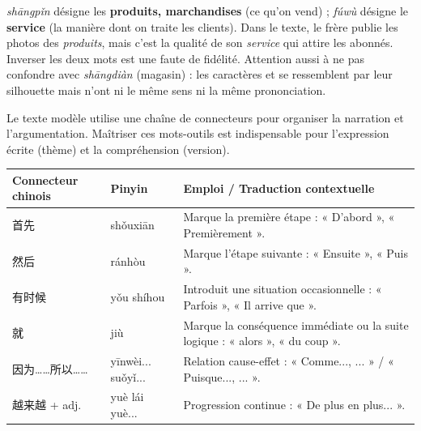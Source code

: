 \documentclass[11pt]{article}
\newcommand{\zh}[1]{\ifmmode\text{#1}\else{#1}\fi}
\begin{document}
\begin{attention}
\zh{商品} \emph{shāngpǐn} désigne les \textbf{produits, marchandises} (ce qu'on vend) ; \zh{服务} \emph{fúwù} désigne le \textbf{service} (la manière dont on traite les clients). Dans le texte, le frère publie les photos des \emph{produits}, mais c'est la qualité de son \emph{service} qui attire les abonnés. Inverser les deux mots est une faute de fidélité. Attention aussi à ne pas confondre \zh{商品} avec \zh{商店} \emph{shāngdiàn} (magasin) : les caractères \zh{品} et \zh{店} se ressemblent par leur silhouette mais n'ont ni le même sens ni la même prononciation.
\end{attention}

\begin{propriete}
Le texte modèle utilise une chaîne de connecteurs pour organiser la narration et l'argumentation. Maîtriser ces mots-outils est indispensable pour l'expression écrite (thème) et la compréhension (version).

\begin{center}
\begin{tabularx}{\linewidth}{|X|X|X|}
\hline
\rowcolor{popblueL} Connecteur chinois & Pinyin & Emploi / Traduction contextuelle \\
\hline
首先 & shǒuxiān & Marque la première étape : « D'abord », « Premièrement ». \\
\hline
然后 & ránhòu & Marque l'étape suivante : « Ensuite », « Puis ». \\
\hline
有时候 & yǒu shíhou & Introduit une situation occasionnelle : « Parfois », « Il arrive que ». \\
\hline
就 & jiù & Marque la conséquence immédiate ou la suite logique : « alors », « du coup ». \\
\hline
因为……所以…… & yīnwèi... suǒyǐ... & Relation cause-effet : « Comme..., ... » / « Puisque..., ... ». \\
\hline
越来越 + adj. & yuè lái yuè... & Progression continue : « De plus en plus... ». \\
\hline
\end{tabularx}
\end{center}
\end{propriete}
\end{document}
